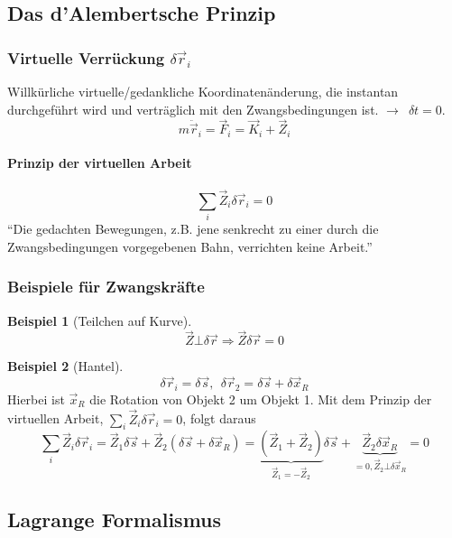 \documentclass[oneside]{book}
\theoremstyle{definition}
\newtheorem*{beispiel*}{Beispiel}
\newcommand{\conseq}{$\rightarrow$~}
\newcommand{\rvec}{\vec{r}}
\newcommand{\ddotvec}[1]{\ddot{\vec{#1}}}
\begin{document}
\subsection{Das d'Alembertsche Prinzip}

\subsubsection{Virtuelle Verrückung $\delta \vec{r}_i$} Willkürliche virtuelle/gedankliche Koordinatenänderung, die instantan durchgeführt wird und verträglich mit den Zwangsbedingungen ist. \conseq $\delta t = 0$.
$$m \ddotvec{r}_i = \vec{F}_i = \vec{K}_i + \vec{Z}_i$$


\paragraph{Prinzip der virtuellen Arbeit}
$$\sum_i \vec{Z}_i \delta \vec{r}_i = 0$$
"`Die gedachten Bewegungen, z.B. jene senkrecht zu einer durch die Zwangsbedingungen vorgegebenen Bahn, verrichten keine Arbeit."'

\subsubsection{Beispiele für Zwangskräfte}

\begin{beispiel*}[Teilchen auf Kurve]
	$$\vec{Z} \bot \delta \vec{r} \Rightarrow \vec{Z} \delta \vec{r} = 0$$
\end{beispiel*}

\begin{beispiel*}[Hantel]
	$$\delta \vec{r}_i = \delta\vec{s},~~ \delta \vec{r}_2 = \delta \vec{s} + \delta \vec{x}_R$$
	Hierbei ist $\vec{x}_R$ die Rotation von Objekt 2 um Objekt 1.
	Mit dem Prinzip der virtuellen Arbeit, $\sum_i \vec{Z}_i \delta \vec{r}_i = 0$, folgt daraus
	$$\sum_i \vec Z_i \delta \vec{r}_i = \vec{Z}_1 \delta \vec{s} + \vec{Z}_2 (\delta \vec{s} + \delta \vec{x}_R) 
	= \underbrace{(\vec{Z}_1 + \vec{Z}_2)}_{\vec{Z}_1 = - \vec{Z}_2} \delta \vec{s} + \underbrace{\vec{Z}_2 \delta \vec{x}_R}_{= 0, \vec{Z}_2 \bot \delta \vec{x}_R} = 0$$
\end{beispiel*}

\subsection{Lagrange Formalismus}
\end{document}
